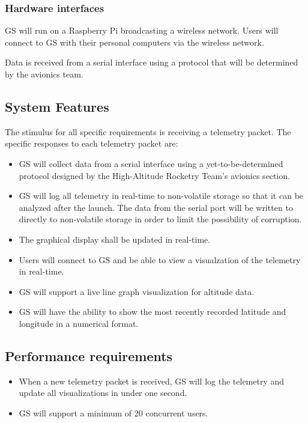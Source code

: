 \documentclass[10pt,draftclsnofoot,onecolumn]{IEEEtran}
\begin{document}
	\subsubsection{Hardware interfaces}
	GS will run on a Raspberry Pi broadcasting a wireless network. Users will connect to GS with their personal computers
	via the wireless network.

	Data is received from a serial interface using a protocol that will be determined by the avionics team.
	
	\subsection{System Features}
	
	The stimulus for all specific requirements is receiving a telemetry packet. The specific responses to each telemetry packet are:
	\begin{itemize}
		\item GS will collect data from a serial interface using a yet-to-be-determined protocol designed by the High-Altitude Rocketry Team's avionics section.
		\item GS will log all telemetry in real-time to non-volatile storage so that it can be analyzed
		after the launch.
		The data from the serial port will be written to directly to non-volatile storage in order to limit
		the possibility of corruption.
		\item The graphical display shall be updated in real-time.
		\item Users will connect to GS and be able to view a visualzation of the telemetry in real-time.
		\item GS will support a live line graph visualization for altitude data.
		\item GS will have the ability to show the most recently recorded latitude and longitude in a numerical format.
	\end{itemize}
	
	\subsection{Performance requirements}
	
	\begin{itemize}
		\item When a new telemetry packet is received, GS will log the telemetry and update all visualizations in under one second.
		\item GS will support a minimum of 20 concurrent users.
	\end{itemize}
\end{document}
